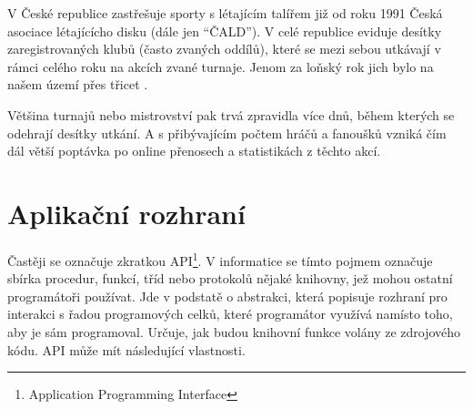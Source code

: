 V České republice zastřešuje sporty s létajícím talířem již od roku 1991\cite{cald-historie} Česká asociace
lé\-ta\-jícícho disku (dále jen ``ČALD''). V celé republice eviduje desítky zaregistrovaných
klubů (často zvaných oddílů), které se mezi sebou utkávají v rámci celého roku na akcích zvané turnaje.
Jenom za loňský rok jich bylo na našem území přes třicet \cite{cald-kalendar}.

\medskip

Většina turnajů nebo mistrovství pak trvá zpravidla více dnů, během kterých se odehrají desítky
utkání. A s přibývajícím počtem hráčů a fanoušků vzniká čím dál větší poptávka po online
přenosech a statistikách z těchto akcí.









\section{Aplikační rozhraní}

\indent

Častěji se označuje zkratkou API\footnote{Application Programming Interface}.
V informatice se tímto pojmem označuje sbírka procedur, funkcí, tříd
nebo protokolů nějaké knihovny, jež mohou ostatní programátoři používat.
Jde v podstatě o abstrakci, která popisuje rozhraní pro interakci s řadou programových celků,
které programátor využívá namísto toho, aby je sám programoval.
Určuje, jak budou knihovní funkce volány ze zdrojového kódu. API může mít následující vlastnosti.

